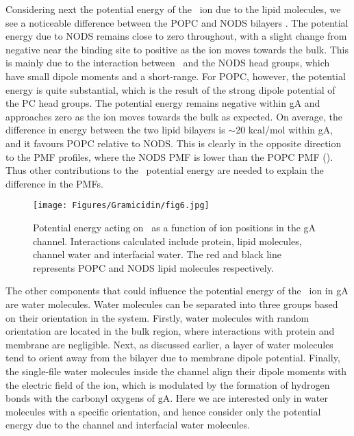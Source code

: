 Considering next the potential energy of the \K\ ion due to the lipid molecules, we see a noticeable 
difference between the POPC and NODS bilayers . The potential energy due to NODS remains 
close to zero throughout, with a slight change from negative near the binding site to positive as the 
ion moves towards the bulk. This is mainly due to the interaction between \K\ and the NODS head groups, 
which have small dipole moments and a short-range. For POPC, however, the potential energy is quite 
substantial, which is the result of the strong dipole potential of the PC head groups. The potential 
energy remains negative within gA and approaches zero as the ion moves towards the bulk as expected. 
On average, the difference in energy between the two lipid bilayers is $\sim$20 kcal/mol within gA, 
and it favours POPC relative to NODS. This is clearly in the opposite direction to the PMF profiles, 
where the NODS PMF is lower than the POPC PMF (). Thus other contributions to the \K\ 
potential energy are needed to explain the difference in the PMFs.

\begin{figure}[b!]
\centering
\texttt{[image: Figures/Gramicidin/fig6.jpg]}
\caption{Potential energy acting on \K\ as a function of ion positions in the gA channel. 
Interactions calculated include protein, lipid molecules, channel water and interfacial water.
The red and black line represents POPC and NODS lipid molecules respectively.}
\label{gA:fig6}
\end{figure}

The other components that could influence the potential energy of the \K\ ion in gA are water 
molecules. Water molecules can be separated into three groups based on their orientation in the 
system. Firstly, water molecules with random orientation are located in the bulk region, where 
interactions with protein and membrane are negligible. Next, as discussed earlier, a layer of 
water molecules tend to orient away from the bilayer due to membrane dipole potential. Finally, 
the single-file water molecules inside the channel align their dipole moments with the electric 
field of the ion, which is modulated by the formation of hydrogen bonds with the carbonyl oxygens 
of gA. Here we are interested only in water molecules with a specific orientation, and hence consider 
only the potential energy due to the channel and interfacial water molecules.

